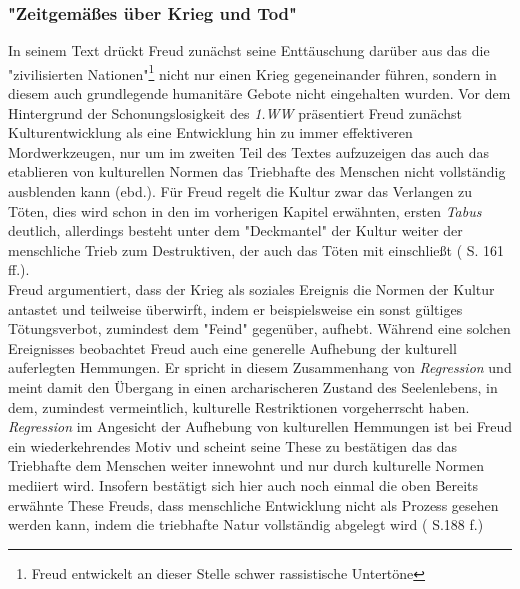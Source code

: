 \documentclass[11pt,a4paper,oneside,numbers=noenddot,bibliography=totocnumbered,DIV=13]{scrartcl}
\begin{document}
{\subsubsection{"Zeitgemäßes über Krieg und Tod"}
In seinem Text drückt Freud zunächst seine Enttäuschung darüber aus das die "zivilisierten Nationen"\footnote{Freud entwickelt an dieser Stelle schwer rassistische Untertöne} nicht nur einen Krieg gegeneinander führen, sondern in diesem auch grundlegende humanitäre Gebote nicht eingehalten wurden. Vor dem Hintergrund der Schonungslosigkeit des \textit{1.WW} präsentiert Freud zunächst Kulturentwicklung als eine Entwicklung hin zu immer effektiveren Mordwerkzeugen, nur um im zweiten Teil des Textes aufzuzeigen das auch das etablieren von kulturellen Normen das Triebhafte des Menschen nicht vollständig ausblenden kann (ebd.). Für Freud regelt die Kultur zwar das Verlangen zu Töten, dies wird schon in den im vorherigen Kapitel erwähnten, ersten \textit{Tabus} deutlich, allerdings besteht unter dem "Deckmantel" der Kultur weiter der menschliche Trieb zum Destruktiven, der auch das Töten mit einschließt (\cite{mccall_society--gang_2006} S. 161 ff.). \\
Freud argumentiert, dass der Krieg als soziales Ereignis die Normen der Kultur antastet und teilweise überwirft, indem er beispielsweise ein sonst gültiges Tötungsverbot, zumindest dem "Feind" gegenüber, aufhebt. Während eine solchen Ereignisses beobachtet Freud auch eine generelle Aufhebung der kulturell auferlegten Hemmungen. Er spricht in diesem Zusammenhang von \textit{Regression} und meint damit den Übergang in einen archarischeren Zustand des Seelenlebens, in dem, zumindest vermeintlich, kulturelle Restriktionen vorgeherrscht haben. \textit{Regression} im Angesicht der Aufhebung von kulturellen Hemmungen ist bei Freud ein wiederkehrendes Motiv und scheint seine These zu bestätigen das das Triebhafte dem Menschen weiter innewohnt und nur durch kulturelle Normen mediiert wird. Insofern bestätigt sich hier auch noch einmal die oben Bereits erwähnte These Freuds, dass menschliche Entwicklung nicht als Prozess gesehen werden kann, indem die triebhafte Natur vollständig abgelegt wird (\cite{lohmann_freud-handbuch:_2013} S.188 f.)\\
}
\end{document}
